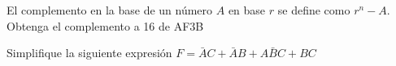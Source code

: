 \documentclass[addpoints]{exam}
\begin{document}
\begin{questions}
\droptotalpoints %

\question[\half] El complemento en la base de un número $A$ en base $r$ se
define como $r^n-A$. Obtenga el complemento a 16 de AF3B


\question Simplifique la siguiente expresión
$F=\bar{A}C+\bar{A}B+A\bar{B}C+BC$
\droptotalpoints




\end{questions}
\end{document}
